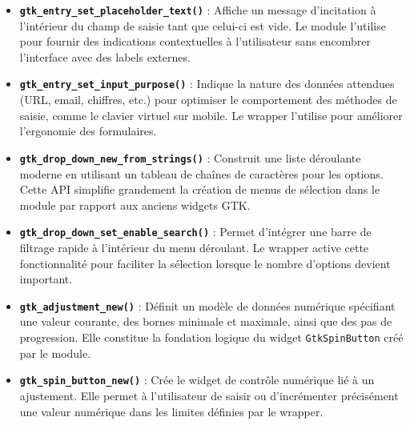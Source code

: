 \begin{itemize}
    \item \textbf{\texttt{gtk\_entry\_set\_placeholder\_text()}} : Affiche un message d'incitation à l'intérieur du champ de saisie tant que celui-ci est vide. Le module l'utilise pour fournir des indications contextuelles à l'utilisateur sans encombrer l'interface avec des labels externes.
    \item \textbf{\texttt{gtk\_entry\_set\_input\_purpose()}} : Indique la nature des données attendues (URL, email, chiffres, etc.) pour optimiser le comportement des méthodes de saisie, comme le clavier virtuel sur mobile. Le wrapper l'utilise pour améliorer l'ergonomie des formulaires.
    \item \textbf{\texttt{gtk\_drop\_down\_new\_from\_strings()}} : Construit une liste déroulante moderne en utilisant un tableau de chaînes de caractères pour les options. Cette API simplifie grandement la création de menus de sélection dans le module par rapport aux anciens widgets GTK.
    \item \textbf{\texttt{gtk\_drop\_down\_set\_enable\_search()}} : Permet d'intégrer une barre de filtrage rapide à l'intérieur du menu déroulant. Le wrapper active cette fonctionnalité pour faciliter la sélection lorsque le nombre d'options devient important.
    \item \textbf{\texttt{gtk\_adjustment\_new()}} : Définit un modèle de données numérique spécifiant une valeur courante, des bornes minimale et maximale, ainsi que des pas de progression. Elle constitue la fondation logique du widget \texttt{GtkSpinButton} créé par le module.
    \item \textbf{\texttt{gtk\_spin\_button\_new()}} : Crée le widget de contrôle numérique lié à un ajustement. Elle permet à l'utilisateur de saisir ou d'incrémenter précisément une valeur numérique dans les limites définies par le wrapper.
\end{itemize}

\newpage
